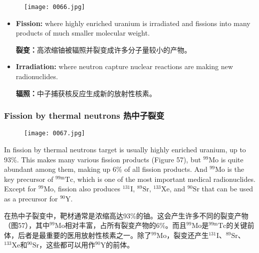 \documentclass[dvipsnames, svgnames,a4paper,11pt]{article}
\begin{document}
\begin{figure}[ht]
    \centering
    \texttt{[image: 0066.jpg]}
     \label{fig56}
\end{figure}


\begin{itemize}
      \item \textbf{Fission:} where highly enriched uranium is irradiated and fissions into many products of much smaller molecular weight.

            \textbf{裂变：}高浓缩铀被辐照并裂变成许多分子量较小的产物。

      \item \textbf{Irradiation:} where neutron capture nuclear reactions are making new radionuclides.

            \textbf{辐照：}中子捕获核反应生成新的放射性核素。
\end{itemize}
\subsubsection{Fission by thermal neutrons  热中子裂变}

\begin{figure}[ht]
    \centering
    \texttt{[image: 0067.jpg]}
     \label{fig57}
\end{figure}


In fission by thermal neutrons target is usually highly enriched uranium, up to 93\%. This makes many various fission products (Figure 57), but ${}^\text{99}\text{Mo}$ is quite abundant among them, making up 6\% of all fission products. And ${}^\text{99}\text{Mo}$ is the key precursor of ${}^\text{99m}\text{Tc}$, which is one of the most important medical radionuclides. Except for ${}^\text{99}\text{Mo}$, fission also produces ${}^\text{131}\text{I}$, ${}^\text{89}\text{Sr}$, ${}^\text{133}\text{Xe}$, and ${}^\text{90}\text{Sr}$ that can be used as a precursor for ${}^\text{90}\text{Y}$.

在热中子裂变中，靶材通常是浓缩高达93\%的铀。这会产生许多不同的裂变产物（图57），其中${}^\text{99}\text{Mo}$相对丰富，占所有裂变产物的6\%。而且${}^\text{99}\text{Mo}$是${}^\text{99m}\text{Tc}$的关键前体，后者是最重要的医用放射性核素之一。除了${}^\text{99}\text{Mo}$，裂变还产生${}^\text{131}\text{I}$、${}^\text{89}\text{Sr}$、${}^\text{133}\text{Xe}$和${}^\text{90}\text{Sr}$，这些都可以用作${}^\text{90}\text{Y}$的前体。
\end{document}

